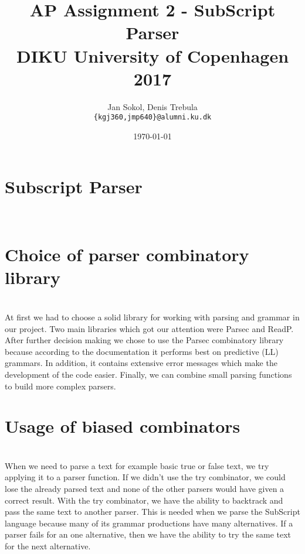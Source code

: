 \documentclass[11pt]{article}
\title{
  \vspace{3cm}
  \Huge{AP Assignment 2 - SubScript Parser} \\
  \Large{DIKU University of Copenhagen 2017}
}
\author{
  \Large{Jan Sokol, Denis Trebula}
  \\ \texttt{\{kgj360,jmp640\}@alumni.ku.dk} \\
}
\date{
    \today
}
\def \ColourPDF {include/ku-farve}
\def \TitlePDF   {include/ku-en}  %
\begin{document}


\clearpage\maketitle
\thispagestyle{empty}

\newpage




\section{Subscript Parser} \\


\section{Choice of parser combinatory library} \\

At first we had to choose a solid library for working with parsing and grammar in our project. Two main
libraries which got our attention were Parsec and ReadP. After further decision making we chose to use
the Parsec combinatory library because according to the documentation it performs best on predictive
(LL) grammars. In addition, it contains extensive error messages which make the development of the
code easier. Finally, we can combine small parsing functions to build more complex parsers.
\section{Usage of biased combinators} \\

When we need to parse a text for example basic true or false text, we try applying it to a parser
function. If we didn’t use the try combinator, we could lose the already parsed text and none of the
other parsers would have given a correct result.
 With the try combinator, we have the ability to backtrack and pass the same text to another
parser. This is needed when we parse the SubScript language because many of its grammar productions
have many alternatives. If a parser fails for an one alternative, then we have the ability to try the same
text for the next alternative.
\end{document}
